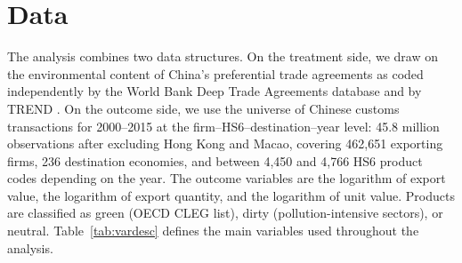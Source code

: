 \documentclass[12pt]{article}
\begin{document}
\section{Data}\label{sec:background}

The analysis combines two data structures. On the treatment side, we draw on the
environmental content of China's preferential trade agreements as coded independently by
the World Bank Deep Trade Agreements database \citep{hofmann2017} and by TREND
\citep{morin2017}. On the outcome side, we use the universe of Chinese customs
transactions for 2000--2015 at the firm--HS6--destination--year level: 45.8 million
observations after excluding Hong Kong and Macao, covering 462{,}651 exporting firms,
236 destination economies, and between 4{,}450 and 4{,}766 HS6 product codes depending
on the year. The outcome variables are the logarithm of export value, the logarithm
of export quantity, and the logarithm of unit value. Products are classified as green
(OECD CLEG list), dirty (pollution-intensive sectors), or neutral. Table~\ref{tab:vardesc}
defines the main variables used throughout the analysis.
\end{document}
